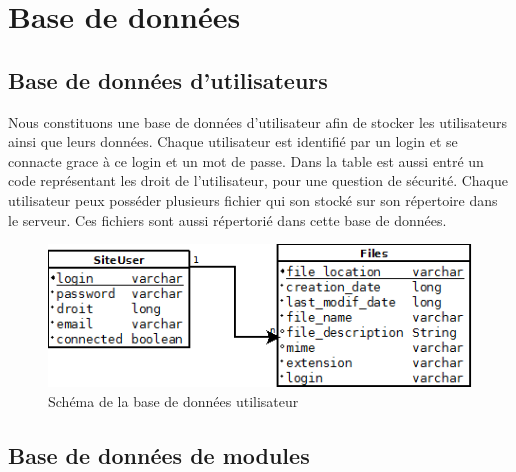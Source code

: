 \section{Base de données}

\subsection{Base de données d'utilisateurs}

Nous constituons une base de données d'utilisateur afin de stocker les utilisateurs ainsi que leurs données. Chaque utilisateur est identifié par un login et se connacte grace à ce login et un mot de passe. Dans la table est aussi entré un code représentant les droit de l'utilisateur, pour une question de sécurité. Chaque utilisateur peux posséder plusieurs fichier qui son stocké sur son répertoire dans le serveur. Ces fichiers sont aussi répertorié dans cette base de données.
\begin{figure}[position]
   \caption{Schéma de la base de données utilisateur}
   \includegraphics[scale=1]{BD1.png} 
\end{figure}


\subsection{Base de données de modules}
